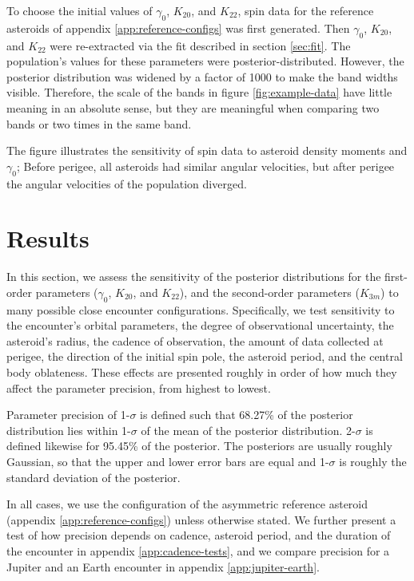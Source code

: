 \documentclass[fleqn,usenatbib]{mnras}
\begin{document}
To choose the initial values of $\gamma_0$, $K_{20}$, and $K_{22}$, spin data for the reference asteroids of appendix \ref{app:reference-configs} was first generated. Then $\gamma_0$, $K_{20}$, and $K_{22}$ were re-extracted via the fit described in section \ref{sec:fit}. The population's values for these parameters were posterior-distributed. However, the posterior distribution was widened by a factor of 1000 to make the band widths visible. Therefore, the scale of the bands in figure \ref{fig:example-data} have little meaning in an absolute sense, but they are meaningful when comparing two bands or two times in the same band.

The figure illustrates the sensitivity of spin data to asteroid density moments and $\gamma_0$; Before perigee, all asteroids had similar angular velocities, but after perigee the angular velocities of the population diverged.




\section{Results}
\label{sec:results}

In this section, we assess the sensitivity of the posterior distributions for the first-order parameters ($\gamma_0$, $K_{20}$, and $K_{22}$), and the second-order parameters ($K_{3m}$) to many possible close encounter configurations. Specifically, we test sensitivity to the encounter's orbital parameters, the degree of observational uncertainty, the asteroid's radius, the cadence of observation, the amount of data collected at perigee, the direction of the initial spin pole, the asteroid period, and the central body oblateness. These effects are presented roughly in order of how much they affect the parameter precision, from highest to lowest.

Parameter precision of 1-$\sigma$ is defined such that 68.27\% of the posterior distribution lies within 1-$\sigma$ of the mean of the posterior distribution. 2-$\sigma$ is defined likewise for 95.45\% of the posterior. The posteriors are usually roughly Gaussian, so that the upper and lower error bars are equal and 1-$\sigma$ is roughly the standard deviation of the posterior.

In all cases, we use the configuration of the asymmetric reference asteroid (appendix \ref{app:reference-configs}) unless otherwise stated. We further present a test of how precision depends on cadence, asteroid period, and the duration of the encounter in appendix \ref{app:cadence-tests}, and we compare precision for a Jupiter and an Earth encounter in appendix \ref{app:jupiter-earth}.
\end{document}
